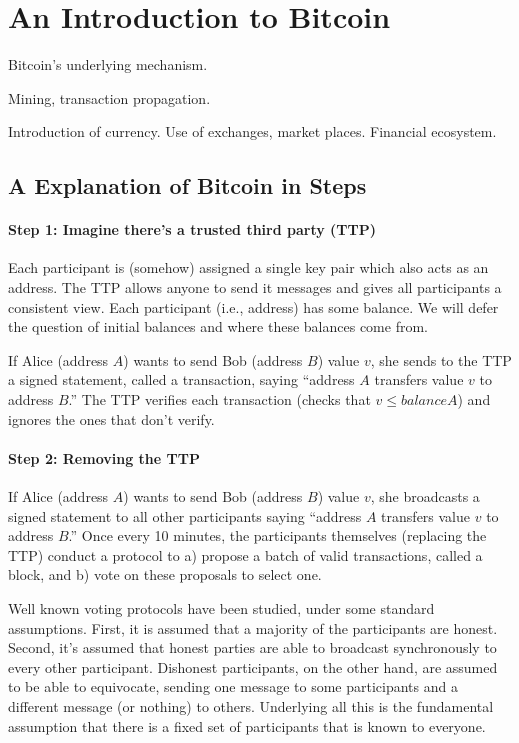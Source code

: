 \section{An Introduction to Bitcoin}

Bitcoin's underlying mechanism.

Mining, transaction propagation.

Introduction of currency. Use of exchanges, market places. Financial ecosystem.

\subsection{A Explanation of Bitcoin in Steps}

\paragraph{Step 1: Imagine there’s a trusted third party (TTP)}
 Each participant is (somehow) assigned a single key pair which also acts as an address. The TTP allows anyone to send it messages and gives all participants a consistent view. Each participant (i.e., address) has some balance. We will defer the question of initial balances and where these balances come from.

If Alice (address $A$) wants to send Bob (address $B$) value $v$, she sends to the TTP a signed statement, called a transaction, saying “address $A$ transfers value $v$ to address $B$.” The TTP verifies each transaction (checks that $v ≤ balanceA$) and ignores the ones that don’t verify.

\paragraph{Step 2: Removing the TTP}

If Alice (address $A$) wants to send Bob (address $B$) value $v$, she broadcasts a signed statement to all other participants saying “address $A$ transfers value $v$ to address $B$.” Once every 10 minutes, the participants themselves (replacing the TTP) conduct a protocol to a) propose a batch of valid transactions, called a block, and b) vote on these proposals to select one.

Well known voting protocols have been studied, under some standard assumptions. First, it is assumed that a majority of the participants are honest. Second, it’s assumed that honest parties are able to broadcast synchronously to every other participant. Dishonest participants, on the other hand, are assumed to be able to equivocate, sending one message to some participants and a different message (or nothing) to others. Underlying all this is the fundamental assumption that there is a fixed set of participants that is known to everyone.

